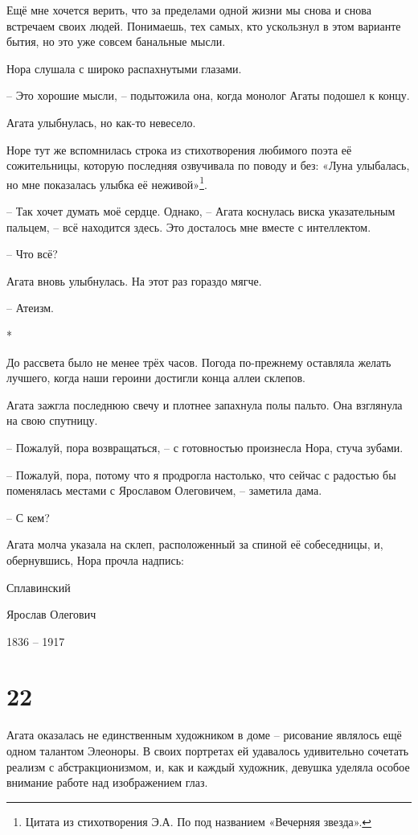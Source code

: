 \documentclass[
  a5paperpaper,
  DIV=11,
  numbers=noendperiod]{scrreprt}
\begin{document}
Ещё мне хочется верить, что за пределами одной жизни мы снова и снова
встречаем своих людей. Понимаешь, тех самых, кто ускользнул в этом
варианте бытия, но это уже совсем банальные мысли.

Нора слушала с широко распахнутыми глазами.

-- Это хорошие мысли, -- подытожила она, когда монолог Агаты подошел к
концу.

Агата улыбнулась, но как-то невесело.

Норе тут же вспомнилась строка из стихотворения любимого поэта её
сожительницы, которую последняя озвучивала по поводу и без: «Луна
улыбалась, но мне показалась улыбка её неживой»\footnote{Цитата из
  стихотворения Э.А. По под названием «Вечерняя звезда».}.

-- Так хочет думать моё сердце. Однако, -- Агата коснулась виска
указательным пальцем, -- всё находится здесь. Это досталось мне вместе с
интеллектом.

-- Что всё?

Агата вновь улыбнулась. На этот раз гораздо мягче.

-- Атеизм.

*

До рассвета было не менее трёх часов. Погода по-прежнему оставляла
желать лучшего, когда наши героини достигли конца аллеи склепов.

Агата зажгла последнюю свечу и плотнее запахнула полы пальто. Она
взглянула на свою спутницу.

-- Пожалуй, пора возвращаться, -- с готовностью произнесла Нора, стуча
зубами.

-- Пожалуй, пора, потому что я продрогла настолько, что сейчас с
радостью бы поменялась местами с Ярославом Олеговичем, -- заметила дама.

-- С кем?

Агата молча указала на склеп, расположенный за спиной её собеседницы, и,
обернувшись, Нора прочла надпись:

Сплавинский

Ярослав Олегович

1836 -- 1917

\section*{22}\label{22}


Агата оказалась не единственным художником в доме -- рисование являлось
ещё одном талантом Элеоноры. В своих портретах ей удавалось удивительно
сочетать реализм с абстракционизмом, и, как и каждый художник, девушка
уделяла особое внимание работе над изображением глаз.
\end{document}
